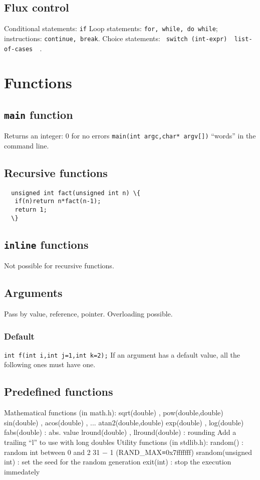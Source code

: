 \documentclass{article}
\newcommand{\code}[1]{\texttt {#1}}
\begin{document}
\subsection{Flux control}
Conditional statements: \code{if}
Loop statements: \code{for, while, do while}; instructions: \code{continue, break}.
Choice statements: \code{ switch (int-expr) { list-of-cases } }.





\section{Functions}

\subsection{\code{main} function}
Returns an integer: 0 for no errors
\texttt{main(int argc,char* argv[])} “words” in
the command line.

\subsection{Recursive functions}
\begin{lstlisting}
  unsigned int fact(unsigned int n) \{
   if(n)return n*fact(n-1);
   return 1;
  \}
\end{lstlisting}

\subsection{\code{inline} functions}
Not possible for recursive functions.

\subsection{Arguments}
Pass by value, reference, pointer.
Overloading possible.



\subsubsection{Default}
\texttt{int f(int i,int j=1,int k=2);}
If an argument has a default value, all the following ones
must have one.

\subsection{Predefined functions}
Mathematical functions (in math.h):
sqrt(double) , pow(double,double)
sin(double) , acos(double) , ...
atan2(double,double)
exp(double) , log(double)
fabs(double) : abs. value
lround(double) , llround(double) : rounding
Add a trailing “l” to use with long doubles
Utility functions (in stdlib.h):
random() : random int
between 0 and 2 31 − 1 (RAND\_MAX≡0x7fffffff)
srandom(unsigned int) : set the seed for the random
generation
exit(int) : stop the execution immedately
\end{document}
